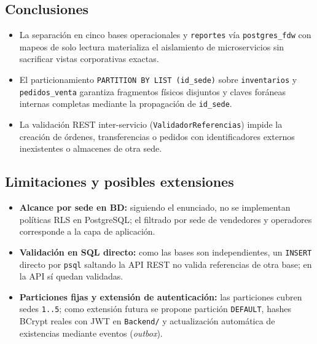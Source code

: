\documentclass[11pt,oneside]{article}
\begin{document}
\subsection{Conclusiones}
\begin{itemize}[leftmargin=1.5em, itemsep=2.5pt]
  \item La separaci\'on en cinco bases operacionales y \texttt{reportes} v\'ia
        \texttt{postgres\_fdw} con mapeos de solo lectura materializa el
        aislamiento de microservicios sin sacrificar vistas corporativas exactas.
  \item El particionamiento \texttt{PARTITION BY LIST (id\_sede)} sobre
        \texttt{inventarios} y \texttt{pedidos\_venta} garantiza fragmentos
        f\'isicos disjuntos y claves for\'aneas internas completas mediante la
        propagaci\'on de \texttt{id\_sede}.
  \item La validaci\'on REST inter-servicio (\texttt{ValidadorReferencias})
        impide la creaci\'on de \'ordenes, transferencias o pedidos con
        identificadores externos inexistentes o almacenes de otra sede.
\end{itemize}

\subsection{Limitaciones y posibles extensiones}
\begin{itemize}[leftmargin=1.5em, itemsep=2.5pt]
  \item \textbf{Alcance por sede en BD:} siguiendo el enunciado, no se
        implementan pol\'iticas RLS en PostgreSQL; el filtrado por sede de
        vendedores y operadores corresponde a la capa de aplicaci\'on.
  \item \textbf{Validaci\'on en SQL directo:} como las bases son
        independientes, un \texttt{INSERT} directo por \texttt{psql} saltando
        la API REST no valida referencias de otra base; en la API s\'i quedan
        validadas.
  \item \textbf{Particiones fijas y extensi\'on de autenticaci\'on:} las
        particiones cubren sedes \texttt{1..5}; como extensi\'on futura se
        propone partici\'on \texttt{DEFAULT}, hashes BCrypt reales con JWT en
        \texttt{Backend/} y actualizaci\'on autom\'atica de existencias mediante
        eventos (\textit{outbox}).
\end{itemize}

\newpage
\appendix
\end{document}
